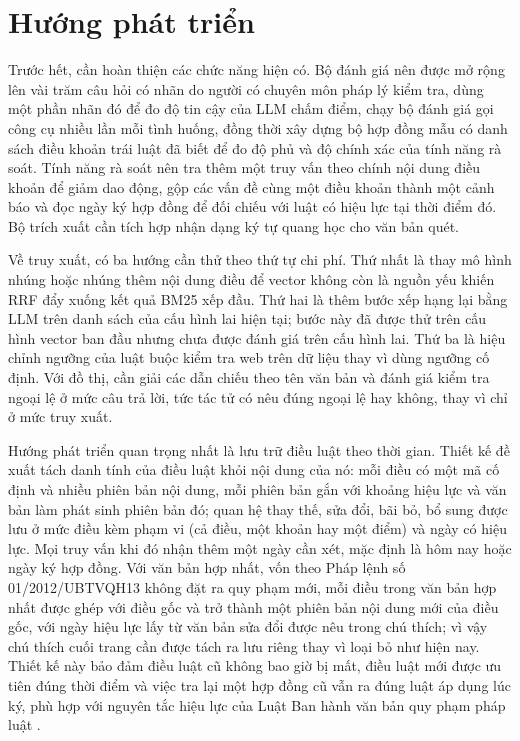 \documentclass[../DoAn.tex]{subfiles}
\begin{document}
\section{Hướng phát triển}
Trước hết, cần hoàn thiện các chức năng hiện có. Bộ đánh giá nên được mở rộng lên vài trăm câu hỏi có nhãn do người có chuyên môn pháp lý kiểm tra, dùng một phần nhãn đó để đo độ tin cậy của LLM chấm điểm, chạy bộ đánh giá gọi công cụ nhiều lần mỗi tình huống, đồng thời xây dựng bộ hợp đồng mẫu có danh sách điều khoản trái luật đã biết để đo độ phủ và độ chính xác của tính năng rà soát. Tính năng rà soát nên tra thêm một truy vấn theo chính nội dung điều khoản để giảm dao động, gộp các vấn đề cùng một điều khoản thành một cảnh báo và đọc ngày ký hợp đồng để đối chiếu với luật có hiệu lực tại thời điểm đó. Bộ trích xuất cần tích hợp nhận dạng ký tự quang học cho văn bản quét.

Về truy xuất, có ba hướng cần thử theo thứ tự chi phí. Thứ nhất là thay mô hình nhúng hoặc nhúng thêm nội dung điều để vector không còn là nguồn yếu khiến RRF đẩy xuống kết quả BM25 xếp đầu. Thứ hai là thêm bước xếp hạng lại bằng LLM trên danh sách của cấu hình lai hiện tại; bước này đã được thử trên cấu hình vector ban đầu nhưng chưa được đánh giá trên cấu hình lai. Thứ ba là hiệu chỉnh ngưỡng của luật buộc kiểm tra web trên dữ liệu thay vì dùng ngưỡng cố định. Với đồ thị, cần giải các dẫn chiếu theo tên văn bản và đánh giá kiểm tra ngoại lệ ở mức câu trả lời, tức tác tử có nêu đúng ngoại lệ hay không, thay vì chỉ ở mức truy xuất.

Hướng phát triển quan trọng nhất là lưu trữ điều luật theo thời gian. Thiết kế đề xuất tách danh tính của điều luật khỏi nội dung của nó: mỗi điều có một mã cố định và nhiều phiên bản nội dung, mỗi phiên bản gắn với khoảng hiệu lực và văn bản làm phát sinh phiên bản đó; quan hệ thay thế, sửa đổi, bãi bỏ, bổ sung được lưu ở mức điều kèm phạm vi (cả điều, một khoản hay một điểm) và ngày có hiệu lực. Mọi truy vấn khi đó nhận thêm một ngày cần xét, mặc định là hôm nay hoặc ngày ký hợp đồng. Với văn bản hợp nhất, vốn theo Pháp lệnh số 01/2012/UBTVQH13 \cite{plhn2012} không đặt ra quy phạm mới, mỗi điều trong văn bản hợp nhất được ghép với điều gốc và trở thành một phiên bản nội dung mới của điều gốc, với ngày hiệu lực lấy từ văn bản sửa đổi được nêu trong chú thích; vì vậy chú thích cuối trang cần được tách ra lưu riêng thay vì loại bỏ như hiện nay. Thiết kế này bảo đảm điều luật cũ không bao giờ bị mất, điều luật mới được ưu tiên đúng thời điểm và việc tra lại một hợp đồng cũ vẫn ra đúng luật áp dụng lúc ký, phù hợp với nguyên tắc hiệu lực của Luật Ban hành văn bản quy phạm pháp luật \cite{luatbhvb2015}.
\end{document}
